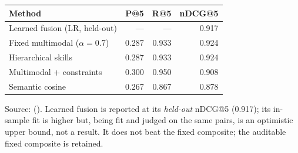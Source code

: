 \caption{Fusion and constraint variants ($K{=}5$).}
\label{tab:fusion}
\begin{tabular}{@{}lrrr@{}}
\toprule
Method & P@5 & R@5 & nDCG@5 \\
\midrule
Learned fusion (LR, held-out) & --- & --- & 0.917 \\
Fixed multimodal ($\alpha{=}0.7$) & 0.287 & 0.933 & 0.924 \\
Hierarchical skills & 0.287 & 0.933 & 0.924 \\
Multimodal + constraints & 0.300 & 0.950 & 0.908 \\
Semantic cosine & 0.267 & 0.867 & 0.878 \\
\bottomrule
\end{tabular}
\par\vspace{0.4em}
\footnotesize{Source:  (). Learned fusion is reported at its \emph{held-out} nDCG@5 (0.917); its in-sample fit is higher but, being fit and judged on the same pairs, is an optimistic upper bound, not a result. It does not beat the fixed composite; the auditable fixed composite is retained.}
